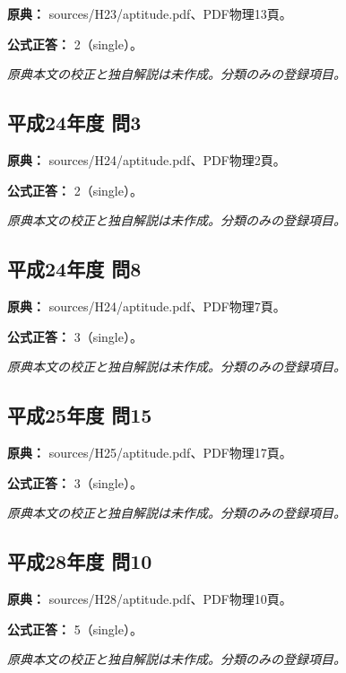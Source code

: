 \noindent\textbf{原典：} sources/H23/aptitude.pdf、PDF物理13頁。

\textbf{公式正答：} 2（single）。

\par\textit{原典本文の校正と独自解説は未作成。分類のみの登録項目。}

\subsection{平成24年度 問3}
\label{q:h24-reg-apt-03}

\noindent\textbf{原典：} sources/H24/aptitude.pdf、PDF物理2頁。

\textbf{公式正答：} 2（single）。

\par\textit{原典本文の校正と独自解説は未作成。分類のみの登録項目。}

\subsection{平成24年度 問8}
\label{q:h24-reg-apt-08}

\noindent\textbf{原典：} sources/H24/aptitude.pdf、PDF物理7頁。

\textbf{公式正答：} 3（single）。

\par\textit{原典本文の校正と独自解説は未作成。分類のみの登録項目。}

\subsection{平成25年度 問15}
\label{q:h25-reg-apt-15}

\noindent\textbf{原典：} sources/H25/aptitude.pdf、PDF物理17頁。

\textbf{公式正答：} 3（single）。

\par\textit{原典本文の校正と独自解説は未作成。分類のみの登録項目。}

\subsection{平成28年度 問10}
\label{q:h28-reg-apt-10}

\noindent\textbf{原典：} sources/H28/aptitude.pdf、PDF物理10頁。

\textbf{公式正答：} 5（single）。

\par\textit{原典本文の校正と独自解説は未作成。分類のみの登録項目。}

